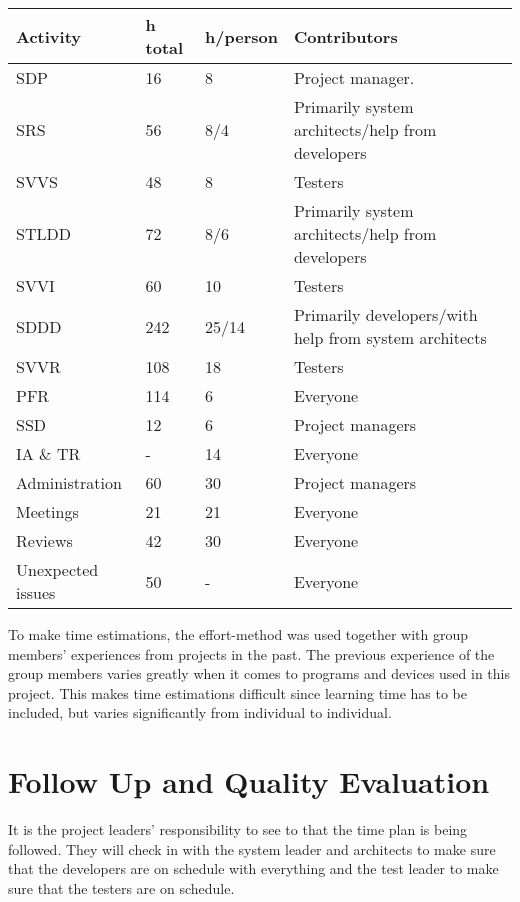 \documentclass[a4paper]{article}
\begin{document}
\begin{center}
    \begin{tabular}{ | l | l | l | p{5cm} |}
    \hline
    \textbf{Activity} & \textbf{h total} & \textbf{h/person} & \textbf{Contributors} \\ \hline
    SDP & 16 & 8 & Project manager. \\ \hline
    SRS & 56 & 8/4 &  Primarily system architects/help from developers\\ \hline
    SVVS & 48 & 8 & Testers\\ \hline
    STLDD & 72 & 8/6 & Primarily system architects/help from developers\\ \hline
    SVVI & 60 & 10 & Testers\\ \hline
    SDDD & 242 & 25/14 & Primarily developers/with help from system architects\\ \hline
    SVVR & 108 & 18 & Testers\\ \hline
    PFR & 114 & 6 & Everyone\\ \hline
    SSD & 12 & 6 & Project managers\\ \hline
    IA \& TR & - & 14 & Everyone \\ \hline
    Administration & 60 & 30 & Project managers \\ \hline
    Meetings & 21 & 21 & Everyone \\ \hline
    Reviews & 42 & 30 & Everyone \\ \hline
    Unexpected issues & 50 & - & Everyone \\ \hline
    \end{tabular}
\end{center}

To make time estimations, the effort-method was used together with group members' experiences from projects in the past. The previous experience of the group members varies greatly when it comes to programs and devices used in this project. This makes time estimations difficult since learning time has to be included, but varies significantly from individual to individual.

\section{Follow Up and Quality Evaluation}

It is the project leaders' responsibility to see to that the time plan is being followed. They will check in with the system leader and architects to make sure that the developers are on schedule with everything and the test leader to make sure that the testers are on schedule. 
\end{document}
